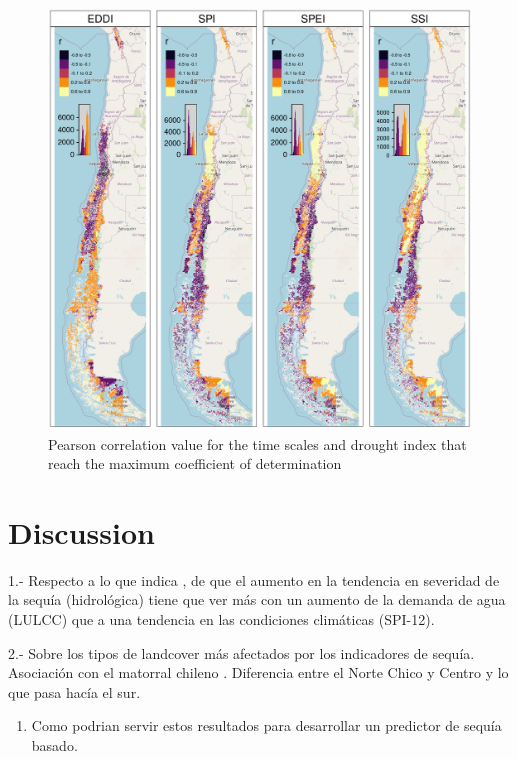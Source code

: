 \documentclass[
  authoryear,
  preprint,
  3p,
  onecolumn]{elsarticle}
\providecommand{\tightlist}{%
  \setlength{\itemsep}{0pt}\setlength{\parskip}{0pt}}\usepackage{longtable,booktabs,array}
\begin{document}
\begin{figure}[!ht]

{\centering \includegraphics{../output/figs/mapa_cor_r_indices_zcNDVI6.png}

}

\caption{\label{fig-corPerson}Pearson correlation value for the time
scales and drought index that reach the maximum coefficient of
determination}

\end{figure}

\hypertarget{discussion}{%
\section{Discussion}\label{discussion}}

1.- Respecto a lo que indica \citet{Vicente-Serrano2018}, de que el
aumento en la tendencia en severidad de la sequía (hidrológica) tiene
que ver más con un aumento de la demanda de agua (LULCC) que a una
tendencia en las condiciones climáticas (SPI-12).

2.- Sobre los tipos de landcover más afectados por los indicadores de
sequía. Asociación con el matorral chileno \citep{Fuentes2021}.
Diferencia entre el Norte Chico y Centro y lo que pasa hacía el sur.

\begin{enumerate}
\def\labelenumi{\arabic{enumi}.}
\setcounter{enumi}{2}
\tightlist
\item
  Como podrian servir estos resultados para desarrollar un predictor de
  sequía basado.
\end{enumerate}
\end{document}

